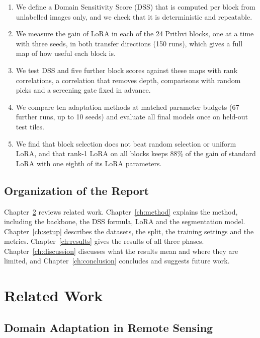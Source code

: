 \documentclass[11pt,a4paper]{report}
\begin{document}
\begin{enumerate}
    \item We define a Domain Sensitivity Score (DSS) that is computed per block from unlabelled images only, and we check that it is deterministic and repeatable.
    \item We measure the gain of LoRA in each of the 24 Prithvi blocks, one at a time with three seeds, in both transfer directions (150 runs), which gives a full map of how useful each block is.
    \item We test DSS and five further block scores against these maps with rank correlations, a correlation that removes depth, comparisons with random picks and a screening gate fixed in advance.
    \item We compare ten adaptation methods at matched parameter budgets (67 further runs, up to 10 seeds) and evaluate all final models once on held-out test tiles.
    \item We find that block selection does not beat random selection or uniform LoRA, and that rank-1 LoRA on all blocks keeps 88\% of the gain of standard LoRA with one eighth of its LoRA parameters.
\end{enumerate}

\section{Organization of the Report}

Chapter~\ref{ch:related} reviews related work. Chapter~\ref{ch:method} explains the method, including the backbone, the DSS formula, LoRA and the segmentation model. Chapter~\ref{ch:setup} describes the datasets, the split, the training settings and the metrics. Chapter~\ref{ch:results} gives the results of all three phases. Chapter~\ref{ch:discussion} discusses what the results mean and where they are limited, and Chapter~\ref{ch:conclusion} concludes and suggests future work.

\chapter{Related Work}
\label{ch:related}

\section{Domain Adaptation in Remote Sensing}
\end{document}

